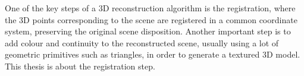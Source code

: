 One of the key steps of a 3D reconstruction algorithm is the registration, where the 3D points corresponding to
 the scene are  registered in a common coordinate system, preserving the original scene disposition. Another important 
step is to add colour and continuity to the reconstructed scene, usually using a lot of geometric primitives such as 
triangles, in order to generate a textured 3D model. This thesis is  about the registration step. 


